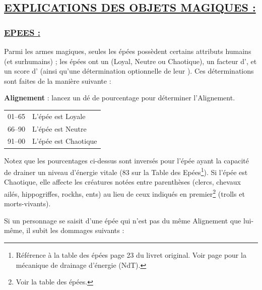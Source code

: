 \subsection*{\uline{EXPLICATIONS DES OBJETS MAGIQUES :}}

\subsubsection*{\uline{EPEES :}}
\label{objet-epees}
{\parindent0pt

Parmi les armes magiques, seules les épées possèdent certains attributs humains (et surhumains) ; les épées ont un  (Loyal, Neutre ou Chaotique), un facteur d', et un score d' (ainsi qu'une détermination optionnelle de leur ). Ces déterminations sont faites de la manière suivante :

\bigskip

\textbf{Alignement} : lancez un dé de pourcentage pour déterminer l'Alignement.

\bigskip

{\parindent2.5cm
\begin{tabular}{p{2.5cm}l}
01--65  & L'épée est Loyale \\
66--90  & L'épée est Neutre \\
91--00  & L'épée est Chaotique \\
\end{tabular}}

\bigskip

Notez que les pourcentages ci-dessus sont inversés pour l'épée ayant la capacité de drainer un niveau d'énergie vitale (83 sur la Table des Epées\footnote{Référence à la table des épées page 23 du livret original. Voir page \pageref{monstre-necrophage} pour la mécanique de drainage d'énergie (NdT).}). Si l'épée est Chaotique, elle affecte les créatures notées entre parenthèses (clercs, chevaux ailés, hippogriffes, rockhs, ents) au lieu de ceux indiqués en premier\footnote{Voir la table des épées.} (trolls et morts-vivants).

\bigskip

Si un personnage se saisit d'une épée qui n'est pas du même Alignement que lui-même, il subit les dommages suivants :

}
